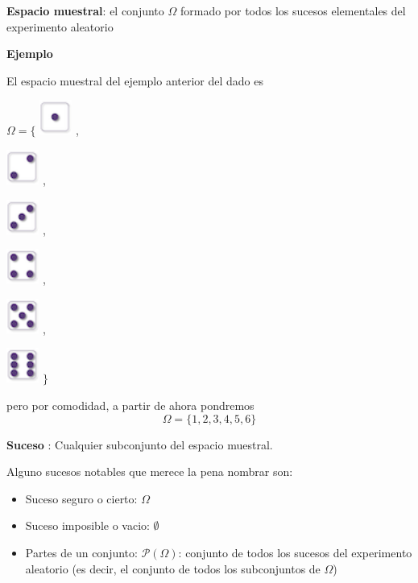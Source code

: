 \documentclass[]{book}
\providecommand{\tightlist}{%
  \setlength{\itemsep}{0pt}\setlength{\parskip}{0pt}}
\begin{document}
\textbf{Espacio muestral}: el conjunto \(\Omega\) formado por todos los sucesos elementales del experimento aleatorio

\textbf{Ejemplo}

El espacio muestral del ejemplo anterior del dado es

\(\Omega=\Big\{\)
\includegraphics[width=0.42in]{Images/proba1dibujos/dice/1} ,

\includegraphics[width=0.42in]{Images/proba1dibujos/dice/2} ,

\includegraphics[width=0.42in]{Images/proba1dibujos/dice/3} ,

\includegraphics[width=0.42in]{Images/proba1dibujos/dice/4} ,

\includegraphics[width=0.42in]{Images/proba1dibujos/dice/5} ,

\includegraphics[width=0.42in]{Images/proba1dibujos/dice/6} \(\Big\}\)

pero por comodidad, a partir de ahora pondremos
\[\Omega = \{1,2,3,4,5,6\}\]

\textbf{Suceso} : Cualquier subconjunto del espacio muestral.

Alguno sucesos notables que merece la pena nombrar son:

\begin{itemize}
\tightlist
\item
  Suceso seguro o cierto: \(\Omega\)
\item
  Suceso imposible o vacio: \(\emptyset\)
\item
  Partes de un conjunto: \(\mathcal{P}(\Omega)\): conjunto de todos los sucesos del experimento aleatorio (es decir, el conjunto de todos los subconjuntos de \(\Omega\))
\end{itemize}
\end{document}
